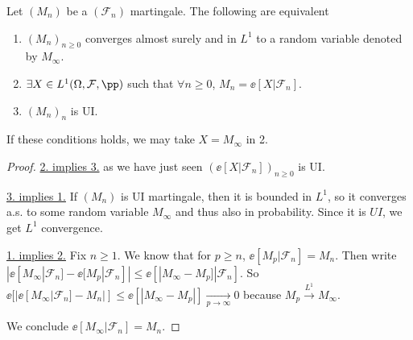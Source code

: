 \documentclass[../main.tex]{subfiles}
\begin{document}
  \begin{theorem}
    Let $(M_n)$ be a $(\mathcal{F}_n)$ martingale. The following are equivalent
    \begin{enumerate}
      \item $(M_n)_{n \geq 0}$ converges almost surely and in $L^1$ to a random
        variable denoted by $M_{\infty}$.
      \item $\exists X \in L^1 (\Omega, \mathcal{F}, \pp)$ such that $\forall n
        \geq 0$, $M_n = \ee[X | \mathcal{F}_n]$.
      \item $(M_n)_{n}$ is UI.
    \end{enumerate}
    If these conditions holds, we may take $X = M_{\infty}$ in 2.
  \end{theorem}
  \begin{proof}
    \hfill

    \underline{2. implies 3.} as we have just seen $(\ee[X | \mathcal{F}_n])_{n \geq 0}$ is
    UI.

    \underline{3. implies 1.} If $(M_n)$ is UI martingale, then it is bounded in
    $L^1$, so it converges a.s. to some random variable $M_{\infty}$ and thus
    also in probability. Since it is $UI$, we get $L^1$ convergence.

    \underline{1. implies 2.} Fix $n \geq 1$. We know that for $p \geq n$,
    $\ee[M_p | \mathcal{F}_n] = M_n $. Then write $|\ee[M_{\infty} |
    \mathcal{F}_n] - \ee[M_p | \mathcal{F}_n]| \leq \ee[|M_{\infty} - M_{p}] |
    \mathcal{F}_n]$. So $\ee[|\ee[M_{\infty} | \mathcal{F}_n] - M_n|] \leq \ee[|M_{\infty} -
    M_p|] \underset{p \to \infty}{\longrightarrow} 0$ because $M_p
    \overset{L^1}{\longrightarrow}M_{\infty}$.

    We conclude $\ee[M_{\infty} | \mathcal{F}_n] = M_n$.

  \end{proof}
\end{document}
